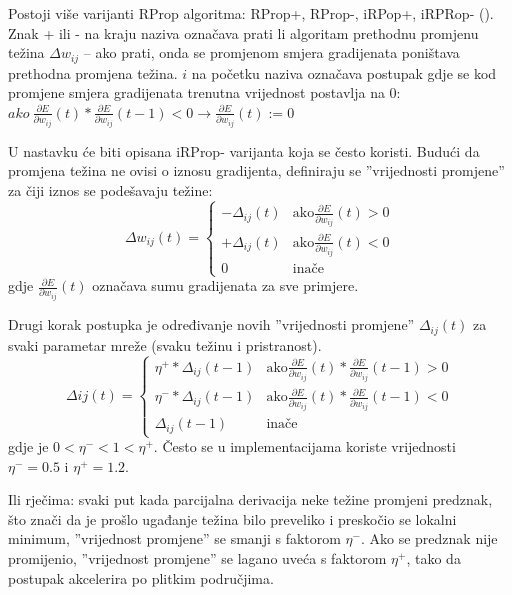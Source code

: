 \documentclass[times, utf8, diplomski, numeric]{fer}
\begin{document}
Postoji više varijanti RProp algoritma: RProp+, RProp-, iRPop+, iRPRop- (\cite{Igel00}).
Znak + ili - na kraju naziva označava prati li algoritam prethodnu promjenu težina $\Delta w_{ij}$  -- ako prati, onda se promjenom smjera gradijenata poništava prethodna promjena težina. $i$ na početku naziva označava postupak gdje se kod promjene smjera gradijenata trenutna vrijednost postavlja na 0: $ako \ \frac{\partial E}{\partial w_{ij}}(t) * \frac{\partial E}{\partial w_{ij}}(t-1) < 0 \rightarrow \frac{\partial E}{\partial w_{ij}}(t) := 0$

U nastavku će biti opisana iRProp- varijanta \cite{Igel00} koja se često koristi. Budući da promjena težina ne ovisi o iznosu gradijenta, definiraju se ''vrijednosti promjene'' za čiji iznos se podešavaju težine:
\begin{equation}
  \Delta w_{ij}(t) =
    \left\{
	    \begin{array}{ll}
		    -\Delta_{ij}(t)  & \mbox{ako} \frac{\partial E}{\partial w_{ij}}(t) > 0 \\
		    +\Delta_{ij}(t)  & \mbox{ako} \frac{\partial E}{\partial w_{ij}}(t) < 0\\
		    0  & \mbox{inače}
	    \end{array}
    \right.
\end{equation}
gdje $\frac{\partial E}{\partial w_{ij}}(t)$ označava sumu gradijenata za sve primjere.

Drugi korak postupka je određivanje novih ''vrijednosti promjene'' $\Delta_{ij}(t)$ za svaki parametar mreže (svaku težinu i pristranost).
\begin{equation}
  \Delta{ij}(t) =
    \left\{
	    \begin{array}{ll}
		    \eta^{+} * \Delta_{ij}(t-1)  & \mbox{ako} \frac{\partial E}{\partial w_{ij}}(t) * \frac{\partial E}{\partial w_{ij}}(t-1) > 0 \\
		    \eta^{-} * \Delta_{ij}(t-1)  & \mbox{ako} \frac{\partial E}{\partial w_{ij}}(t) * \frac{\partial E}{\partial w_{ij}}(t-1) < 0\\
		    \Delta_{ij}(t-1)  & \mbox{inače}
	    \end{array}
    \right.
\end{equation}
gdje je $0 < \eta^{-} < 1 < \eta^{+}$. Često se u implementacijama koriste vrijednosti $\eta^{-} = 0.5$ i $\eta^{+} = 1.2$.

Ili rječima: svaki put kada parcijalna derivacija neke težine promjeni predznak, što znači da je prošlo ugađanje težina bilo preveliko i preskočio se lokalni minimum, ''vrijednost promjene'' se smanji s faktorom $\eta^{-}$. Ako se predznak nije promijenio, ''vrijednost promjene'' se lagano uveća s faktorom $\eta^{+}$, tako da postupak akcelerira po plitkim područjima.
\end{document}
